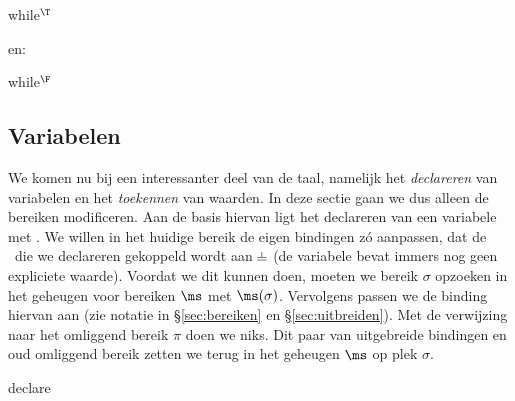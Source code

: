 \begin{NSAxiom}{while$^\T$}
  \begin{prooftree}
  \end{prooftree}
  \begin{NSConditions}
  \end{NSConditions}
\end{NSAxiom}

en:

\begin{NSAxiom}{while$^\F$}
  \begin{prooftree}
  \end{prooftree}
  \begin{NSConditions}
  \end{NSConditions}
\end{NSAxiom}

\subsection{Variabelen}

We komen nu bij een interessanter deel van de taal, namelijk het \emph{declareren} van variabelen en het \emph{toekennen} van waarden. In deze sectie gaan we dus alleen de bereiken modificeren. Aan de basis hiervan ligt het declareren van een variabele met \LOCAL. We willen in het huidige bereik de eigen bindingen zó aanpassen, dat de \Id\ die we declareren gekoppeld wordt aan $\nil$ (de variabele bevat immers nog geen expliciete waarde). Voordat we dit kunnen doen, moeten we bereik $\sigma$ opzoeken in het geheugen voor bereiken $\ms$ met $\ms(\sigma)$. Vervolgens passen we de binding hiervan aan (zie notatie in §\ref{sec:bereiken} en §\ref{sec:uitbreiden}). Met de verwijzing naar het omliggend bereik $\pi$ doen we niks. Dit paar van uitgebreide bindingen en oud omliggend bereik zetten we terug in het geheugen $\ms$ op plek $\sigma$.

\begin{NSAxiom}{declare}
  \begin{prooftree}
  \end{prooftree}
  \begin{NSConditions}
  \end{NSConditions}
\end{NSAxiom}

